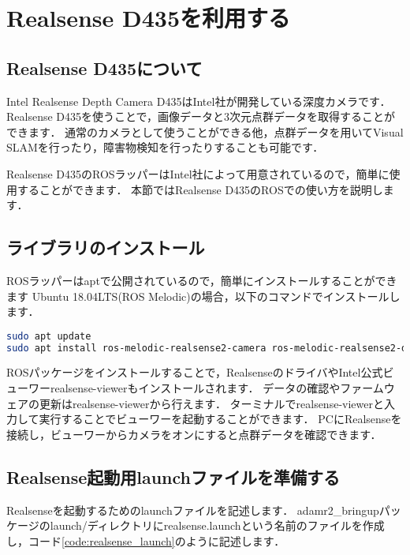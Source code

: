 \documentclass[{../../master}]{subfiles}
\begin{document}
\section{Realsense D435を利用する}

\subsection{Realsense D435について}

Intel Realsense Depth Camera D435はIntel社が開発している深度カメラです．
Realsense D435を使うことで，画像データと3次元点群データを取得することができます．
通常のカメラとして使うことができる他，点群データを用いてVisual SLAMを行ったり，障害物検知を行ったりすることも可能です．

Realsense D435のROSラッパーはIntel社によって用意されているので，簡単に使用することができます．
本節ではRealsense D435のROSでの使い方を説明します．

\subsection{ライブラリのインストール}

ROSラッパーは\textsf{apt}で公開されているので，簡単にインストールすることができます
Ubuntu 18.04LTS(ROS Melodic)の場合，以下のコマンドでインストールします．

\begin{lstlisting}[language=sh, caption=Install Realsense ROS Wrapper]
sudo apt update
sudo apt install ros-melodic-realsense2-camera ros-melodic-realsense2-description
\end{lstlisting}

ROSパッケージをインストールすることで，RealsenseのドライバやIntel公式ビューワー\textsf{realsense-viewer}もインストールされます．
データの確認やファームウェアの更新は\textsf{realsense-viewer}から行えます．
ターミナルで\textsf{realsense-viewer}と入力して実行することでビューワーを起動することができます．
PCにRealsenseを接続し，ビューワーからカメラをオンにすると点群データを確認できます．

\subsection{Realsense起動用launchファイルを準備する}

Realsenseを起動するためのlaunchファイルを記述します．
\textsf{adamr2\_bringup}パッケージの\textsf{launch/}ディレクトリに\textsf{realsense.launch}という名前のファイルを作成し，コード\ref{code:realsense_launch}のように記述します．
\end{document}
